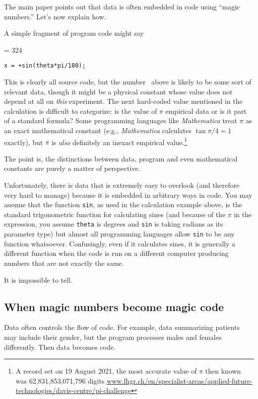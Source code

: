 \documentclass[10pt,a4paper]{article}
\begin{document}
The main paper points out that data is often embedded in code using ``magic numbers.'' Let's now explain how. 

A simple fragment of program code might say

\newcount \magicNumber \magicNumber = 324
\begin{center}\texttt{x = \the\magicNumber+sin(theta*pi/180);}\end{center}

This is clearly all source code, but the number \the\magicNumber\ above is likely to be some sort of relevant data, though it might be a physical constant whose value does not depend at all on \emph{this\/} experiment. The next hard-coded value mentioned in the calculation is difficult to categorize: is the value of $\pi$ empirical data or is it part of a standard formula? Some programming languages like \emph{Mathematica\/} treat $\pi$ as an exact mathematical constant (e.g., \emph{Mathematica\/} calculates $\tan\pi/4 = 1$ exactly), but $\pi$ is \emph{also\/} definitely an inexact empirical value.\footnote{A record set on 19 August 2021, the most accurate value of $\pi$ then known was 62,831,853,071,796 digits %
\url{www.fhgr.ch/en/specialist-areas/applied-future-technologies/davis-centre/pi-challenge}} 

The point is, the distinctions between data, program and even mathematical constants are purely a matter of perspective.

Unfortunately, there is data that is extremely easy to overlook (and therefore very hard to manage) because it is embedded in arbitrary ways in code. You may assume that the function \texttt{sin}, as used in the calculation example above, is the standard trigonometric function for calculating sines (and because of the $\pi$ in the expression, you assume \texttt{theta} is degrees and \texttt{sin} is taking radians as its parameter type) but almost all programming languages allow \texttt{sin} to be any function whatsoever. Confusingly, even if it calculates sines, it is generally a different function when the code is run on a different computer producing numbers that are not exactly the same.

It is impossible to tell. 

\subsection{When magic numbers become magic code}
Data often controls the flow of code. For example, data summarizing patients may include their gender, but the program processes males and females differently. Then data becomes code.
\end{document}
